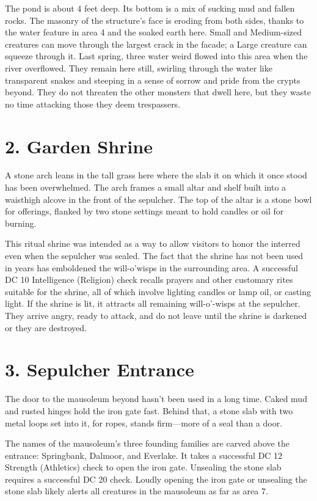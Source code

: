\documentclass[10pt,a4paper,twoside,twocolumn,openany,bg=print,nodeprecatedcode]{dndbook}
\begin{document}
The pond is about 4 feet deep. Its bottom is a mix of sucking mud and fallen rocks.
The masonry of the structure's face is eroding from both sides, thanks to the water feature in area 4 and the soaked earth here. Small and Medium-sized creatures can move through the largest crack in the facade; a Large creature can squeeze through it.
Last spring, three water weird flowed into this area when the river overflowed. They remain here still, swirling through the water like transparent snakes and steeping in a sense of sorrow and pride from the crypts beyond. They do not threaten the other monsters that dwell here, but they waste no time attacking those they deem trespassers.
\section{2. Garden Shrine}
\begin{DndReadAloud}{}
A stone arch leans in the tall grass here where the slab it on which it once stood has been overwhelmed. The arch frames a small altar and shelf built into a waisthigh alcove in the front of the sepulcher. The top of the altar is a stone bowl for offerings, flanked by two stone settings meant to hold candles or oil for burning.
\end{DndReadAloud}

This ritual shrine was intended as a way to allow visitors to honor the interred even when the sepulcher was sealed. The fact that the shrine has not been used in years has emboldened the will-o'wisps in the surrounding area.
A successful DC 10 Intelligence (Religion) check recalls prayers and other customary rites suitable for the shrine, all of which involve lighting candles or lamp oil, or casting light. If the shrine is lit, it attracts all remaining will-o'-wisps at the sepulcher. They arrive angry, ready to attack, and do not leave until the shrine is darkened or they are destroyed.
\section{3. Sepulcher Entrance}
\begin{DndReadAloud}{}
The door to the mausoleum beyond hasn't been used in a long time. Caked mud and rusted hinges hold the iron gate fast. Behind that, a stone slab with two metal loops set into it, for ropes, stands firm—more of a seal than a door.
\end{DndReadAloud}

The names of the mausoleum's three founding families are carved above the entrance: Springbank, Dalmoor, and Everlake.
It takes a successful DC 12 Strength (Athletics) check to open the iron gate. Unsealing the stone slab requires a successful DC 20 check.
Loudly opening the iron gate or unsealing the stone slab likely alerts all creatures in the mausoleum as far as area 7.
\end{document}
